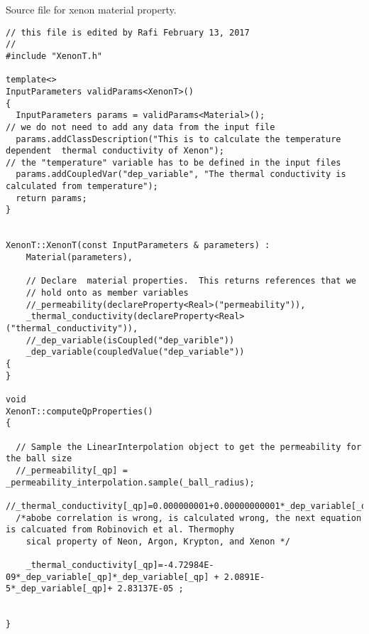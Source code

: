 \pagebreak
\lstset{style=cpp}
Source file for xenon material property.
\begin{lstlisting}
// this file is edited by Rafi February 13, 2017
// 
#include "XenonT.h"

template<>
InputParameters validParams<XenonT>()
{
  InputParameters params = validParams<Material>();
// we do not need to add any data from the input file
  params.addClassDescription("This is to calculate the temperature dependent  thermal conductivity of Xenon");
// the "temperature" variable has to be defined in the input files
  params.addCoupledVar("dep_variable", "The thermal conductivity is calculated from temperature");
  return params;
}


XenonT::XenonT(const InputParameters & parameters) :
    Material(parameters),

    // Declare  material properties.  This returns references that we
    // hold onto as member variables
    //_permeability(declareProperty<Real>("permeability")),
	_thermal_conductivity(declareProperty<Real>("thermal_conductivity")),
	//_dep_variable(isCoupled("dep_varible"))
	_dep_variable(coupledValue("dep_variable"))
{
}

void
XenonT::computeQpProperties()
{

  // Sample the LinearInterpolation object to get the permeability for the ball size
  //_permeability[_qp] = _permeability_interpolation.sample(_ball_radius);
  //_thermal_conductivity[_qp]=0.000000001+0.00000000001*_dep_variable[_qp];
  /*abobe correlation is wrong, is calculated wrong, the next equation is calcuated from Robinovich et al. Thermophy
	sical property of Neon, Argon, Krypton, and Xenon */

	_thermal_conductivity[_qp]=-4.72984E-09*_dep_variable[_qp]*_dep_variable[_qp] + 2.0891E-5*_dep_variable[_qp]+ 2.83137E-05 ;
	 
	
}
\end{lstlisting}
\pagebreak

